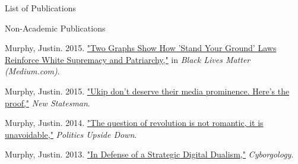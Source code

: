 \documentclass{resume} %
\begin{document}
\begin{rSection}{List of Publications}
\begin{rSubsection}{Non-Academic Publications}{}{}{}
\item Murphy, Justin. 2015. \href{https://medium.com/blacklivesmatter/two-graphs-show-how-stand-your-ground-laws-reinforce-white-supremacy-and-patriarchy-5e60240a8405}{"Two Graphs Show How 'Stand Your Ground' Laws Reinforce White Supremacy and Patriarchy,"} in \emph{Black Lives Matter (Medium.com)}. 
\item Murphy, Justin. 2015. \href{http://www.newstatesman.com/politics/2015/04/ukip-dont-deserve-their-media-prominence-heres-proof}{"Ukip don't deserve their media prominence. Here's the proof,"} \emph{New Statesman}. 
\item Murphy, Justin. 2014. \href{http://sotonpolitics.org/2014/02/06/the-question-of-revolution-is-not-romantic-it-is-unavoidable}{"The question of revolution is not romantic, it is unavoidable,"} \emph{Politics Upside Down}. 
\item Murphy, Justin. 2013. \href{http://thesocietypages.org/cyborgology/2013/08/24/in-defense-of-a-strategic-digital-dualism/}{"In Defense of a Strategic Digital Dualism,"} \emph{Cyborgology}. 
\end{rSubsection}

\end{rSection}

\end{document}
